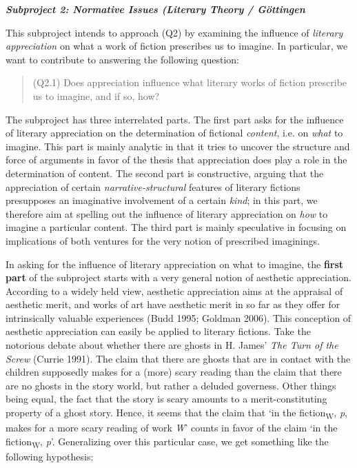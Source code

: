 
\vspace{.2cm}
\noindent\textbf{\emph{Subproject 2: Normative Issues (Literary Theory / G\"ottingen}}
\vspace{.1cm}

\noindent This subproject intends to approach (Q2) by examining the influence of \emph{literary appreciation} on what a work of fiction prescribes us to imagine. In particular, we want to contribute to answering the following question:

\vspace{-.2cm}
\begin{quote}
(Q2.1) Does appreciation influence what literary works of fiction
prescribe us to imagine, and if so, how?
\end{quote}
\vspace{-.2cm}

\noindent The subproject has three interrelated parts. The first part asks for the influence of literary appreciation on the determination of fictional \emph{content}, i.e. on \emph{what} to imagine. This part is mainly analytic in that it tries to uncover the structure and force of arguments in favor of the thesis that appreciation does play a role in the determination of content. The second part is constructive, arguing that the appreciation of certain \emph{narrative-structural} features of literary fictions presupposes an imaginative involvement of a certain \emph{kind}; in this part, we therefore aim at spelling out the influence of literary appreciation on \emph{how} to imagine a particular content. The third part is mainly speculative in focusing on implications of both ventures for the very notion of prescribed imaginings.

In asking for the influence of literary appreciation on what to imagine, the \textbf{first part} of the subproject starts with a very general notion of aesthetic appreciation. According to a widely held view, aesthetic appreciation aims at the appraisal of aesthetic merit, and works of art have aesthetic merit in so far as they offer for intrinsically valuable experiences (Budd 1995; Goldman 2006). This conception of aesthetic appreciation can easily be applied to literary fictions. Take the notorious debate about whether there are ghosts in H. James' \emph{The Turn of the Screw} (Currie 1991). The claim that there are ghosts that are in contact with the children supposedly makes for a (more) scary reading than the claim that there are no ghosts in the story world, but rather a deluded governess. Other things being equal, the fact that the story is scary amounts to a merit-constituting property of a ghost story. Hence, it seems that the claim that `in the fiction\textsubscript{W}, \emph{p}, makes for a more scary reading of work \emph{W}' counts in favor of the claim `in the fiction\textsubscript{W}, \emph{p}'. Generalizing over this particular case, we get something like the following hypothesis: 

